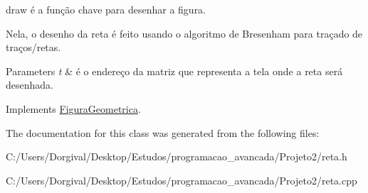 draw é a função chave para desenhar a figura. 

Nela, o desenho da reta é feito usando o algoritmo de Bresenham para traçado de traços/retas. 
\begin{DoxyParams}{Parameters}
{\em t} & é o endereço da matriz que representa a tela onde a reta será desenhada. \\
\hline
\end{DoxyParams}


Implements \mbox{\hyperlink{class_figura_geometrica}{Figura\+Geometrica}}.



The documentation for this class was generated from the following files\+:\begin{DoxyCompactItemize}
\item 
C\+:/\+Users/\+Dorgival/\+Desktop/\+Estudos/programacao\+\_\+avancada/\+Projeto2/reta.\+h\item 
C\+:/\+Users/\+Dorgival/\+Desktop/\+Estudos/programacao\+\_\+avancada/\+Projeto2/reta.\+cpp\end{DoxyCompactItemize}
